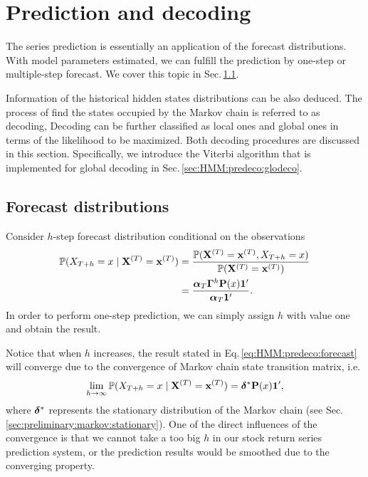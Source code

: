
\section{Prediction and decoding}
\label{sec:HMM:predeco}
The series prediction is essentially an application of the forecast distributions.
With model parameters estimated,
we can fulfill the prediction by one-step or multiple-step forecast.
We cover this topic in Sec.\,\ref{sec:HMM:predeco:forecast}.

Information of the historical hidden states distributions can be also deduced.
The process of find the states occupied by the Markov chain is referred to as decoding,
Decoding can be further classified as local ones and global ones
in terms of the likelihood to be maximized.
Both decoding procedures are discussed in this section.
Specifically, we introduce the Viterbi algorithm that is implemented for global decoding 
in Sec.\,\ref{sec:HMM:predeco:glodeco}.


\subsection{Forecast distributions}
\label{sec:HMM:predeco:forecast}
Consider $h$-step forecast distribution conditional on the observations
		\begin{equation}
		\label{eq:HMM:predeco:forecast}
		\begin{aligned}
		\mathbb{P}(X_{T+h} = x \mid {\mathbf X}^{(T)} = {\mathbf x}^{(T)}) & = 
			\frac{\mathbb{P}({\mathbf X}^{(T)} = {\mathbf x}^{(T)}, X_{T+h} = x)}{\mathbb{P}({\mathbf X}^{(T)} = {\mathbf x}^{(T)})} \\
		& = \frac{{\boldsymbol\alpha}_T{\boldsymbol\Gamma}^h{\mathbf P}(x){\mathbf{1}^{\prime}}}{{\boldsymbol\alpha}_T{\mathbf{1}^{\prime}}}. 
		\end{aligned}
		\end{equation}
In order to perform one-step prediction,
we can simply assign $h$ with value one and obtain the result.

Notice that when $h$ increases, 
the result stated in Eq.\,\ref{eq:HMM:predeco:forecast} will converge
due to the convergence of Markov chain state transition matrix, i.e.
		\begin{equation}
		\label{eq:HMM:predeco:forecast:converge}
		\lim_{h\rightarrow\infty}\mathbb{P}(X_{T+h} = x \mid {\mathbf X}^{(T)} = {\mathbf x}^{(T)}) = {\boldsymbol\delta}^{\ast}{\mathbf P}(x){\mathbf{1}^{\prime}},
		\end{equation}
where ${\boldsymbol\delta}^{\ast}$ represents the stationary distribution of the Markov chain
(see Sec.\,\ref{sec:preliminary:markov:stationary}).
One of the direct influences of the convergence is that
we cannot take a too big $h$ in our stock return series prediction system,
or the prediction results would be smoothed due to the converging property.


